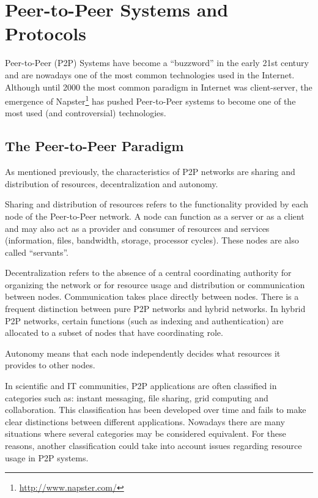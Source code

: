 
\chapter{Peer-to-Peer Systems and Protocols}
\label{chapter:p2p-systems}

Peer-to-Peer (P2P) Systems have become a ``buzzword'' in the early 21st
century and are nowadays one of the most common technologies used in the
Internet. Although until 2000 the most common paradigm in Internet was
client-server, the emergence of Napster\footnote{\url{http://www.napster.com/}} has pushed Peer-to-Peer
systems to become one of the most used (and controversial) technologies.

\section{The Peer-to-Peer Paradigm}
\label{sec:p2p-systems:paragigm}

As mentioned previously, the characteristics of P2P networks are sharing and
distribution of resources, decentralization and autonomy.

Sharing and distribution of resources refers to the functionality provided by
each node of the Peer-to-Peer network. A node can function as a server or as a
client and may also act as a provider and consumer of resources and
services (information, files, bandwidth, storage, processor cycles). These
nodes are also called ``servants''.

Decentralization refers to the absence of a central coordinating authority for
organizing the network or for resource usage and distribution or communication
between nodes. Communication takes place directly between nodes. There is a
frequent distinction between pure P2P networks and hybrid networks. In
hybrid P2P networks, certain functions (such as indexing and authentication)
are allocated to a subset of nodes that have coordinating role.

Autonomy means that each node independently decides what resources it provides
to other nodes.

In scientific and IT communities, P2P applications are often classified in
categories such as: instant messaging, file sharing, grid computing and
collaboration.  This classification has been developed over time and fails to
make clear distinctions between different applications. Nowadays there are
many situations where several categories may be considered equivalent. For
these reasons, another classification could take into account issues regarding
resource usage in P2P systems.

